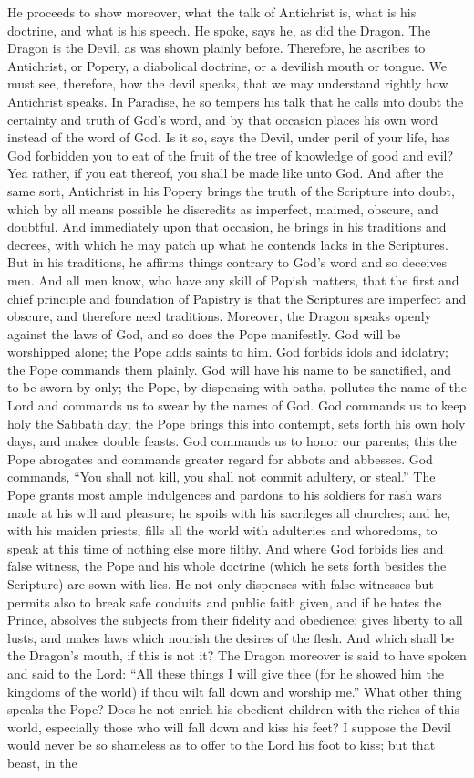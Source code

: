 He proceeds to show moreover, what the talk of Antichrist is, what is his doctrine, and what is his speech. He spoke, says he, as did the Dragon. The Dragon is the Devil, as was shown plainly before. Therefore, he ascribes to Antichrist, or Popery, a diabolical doctrine, or a devilish mouth or tongue. We must see, therefore, how the devil speaks, that we may understand rightly how Antichrist speaks. In Paradise, he so tempers his talk that he calls into doubt the certainty and truth of God’s word, and by that occasion places his own word instead of the word of God. Is it so, says the Devil, under peril of your life, has God forbidden you to eat of the fruit of the tree of knowledge of good and evil? Yea rather, if you eat thereof, you shall be made like unto God. And after the same sort, Antichrist in his Popery brings the truth of the Scripture into doubt, which by all means possible he discredits as imperfect, maimed, obscure, and doubtful. And immediately upon that occasion, he brings in his traditions and decrees, with which he may patch up what he contends lacks in the Scriptures. But in his traditions, he affirms things contrary to God’s word and so deceives men. And all men know, who have any skill of Popish matters, that the first and chief principle and foundation of Papistry is that the Scriptures are imperfect and obscure, and therefore need traditions. Moreover, the Dragon speaks openly against the laws of God, and so does the Pope manifestly. God will be worshipped alone; the Pope adds saints to him. God forbids idols and idolatry; the Pope commands them plainly. God will have his name to be sanctified, and to be sworn by only; the Pope, by dispensing with oaths, pollutes the name of the Lord and commands us to swear by the names of God. God commands us to keep holy the Sabbath day; the Pope brings this into contempt, sets forth his own holy days, and makes double feasts. God commands us to honor our parents; this the Pope abrogates and commands greater regard for abbots and abbesses. God commands, “You shall not kill, you shall not commit adultery, or steal.” The Pope grants most ample indulgences and pardons to his soldiers for rash wars made at his will and pleasure; he spoils with his sacrileges all churches; and he, with his maiden priests, fills all the world with adulteries and whoredoms, to speak at this time of nothing else more filthy. And where God forbids lies and false witness, the Pope and his whole doctrine (which he sets forth besides the Scripture) are sown with lies. He not only dispenses with false witnesses but permits also to break safe conduits and public faith given, and if he hates the Prince, absolves the subjects from their fidelity and obedience; gives liberty to all lusts, and makes laws which nourish the desires of the flesh. And which shall be the Dragon’s mouth, if this is not it? The Dragon moreover is said to have spoken and said to the Lord: “All these things I will give thee (for he showed him the kingdoms of the world) if thou wilt fall down and worship me.” What other thing speaks the Pope? Does he not enrich his obedient children with the riches of this world, especially those who will fall down and kiss his feet? I suppose the Devil would never be so shameless as to offer to the Lord his foot to kiss; but that beast, in the 